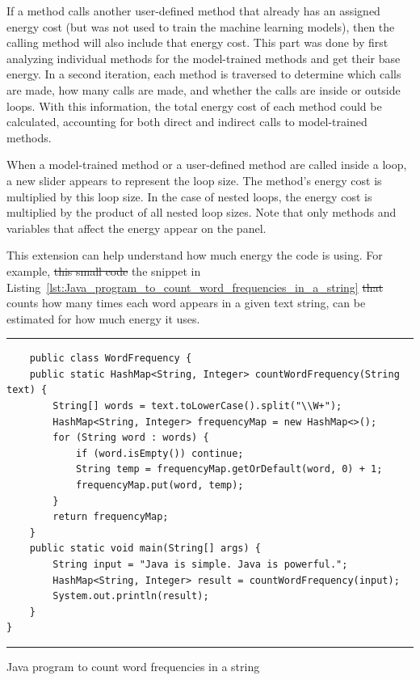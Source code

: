 If a method calls another user-defined method that already has an assigned energy cost (but was not used to train the machine learning models), then the calling method will also include that energy cost. This part was done by first analyzing individual methods for the model-trained methods and get their base energy. In a second iteration, each method is traversed to determine which calls are made, how many calls are made, and whether the calls are inside or outside loops. With this information, the total energy cost of each method could be calculated, accounting for both direct and indirect calls to model-trained methods.

When a model-trained method or a user-defined method are called inside a loop, a new slider appears to represent the loop size. The method’s energy cost is multiplied by this loop size. In the case of nested loops, the energy cost is multiplied by the product of all nested loop sizes. Note that only methods and variables that affect the energy appear on the panel.

This extension can help understand how much energy the code is using.
For example, \st{this small code} the snippet in Listing~\ref{lst:Java_program_to_count_word_frequencies_in_a_string} \st{that} counts how many times each word appears in a given text string, can be estimated for how much energy it uses.

\begin{listing}[htbp]
\noindent\rule{\linewidth}{0.4pt}
\begin{verbatim}
    public class WordFrequency {
    public static HashMap<String, Integer> countWordFrequency(String text) {
        String[] words = text.toLowerCase().split("\\W+");
        HashMap<String, Integer> frequencyMap = new HashMap<>();
        for (String word : words) {
            if (word.isEmpty()) continue; 
            String temp = frequencyMap.getOrDefault(word, 0) + 1;
            frequencyMap.put(word, temp);
        }
        return frequencyMap;
    }
    public static void main(String[] args) {
        String input = "Java is simple. Java is powerful.";
        HashMap<String, Integer> result = countWordFrequency(input);
        System.out.println(result);
    }
}
\end{verbatim}
\noindent\rule{\linewidth}{0.4pt}
\caption{Java program to count word frequencies in a string}            
\label{lst:Java_program_to_count_word_frequencies_in_a_string}
\end{listing}

